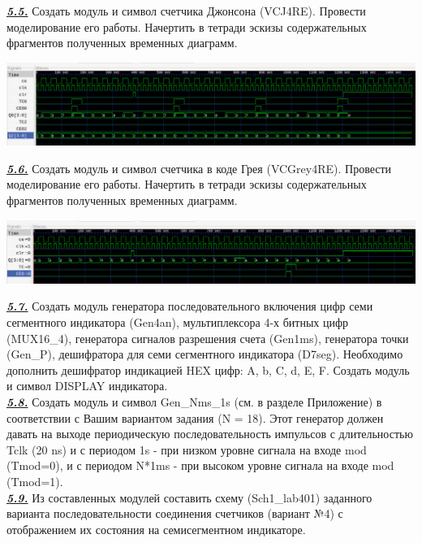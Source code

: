 \documentclass[a4paper]{article}
\begin{document}
\textbf{\textit{\underline{5.5.}}} Создать модуль и символ счетчика Джонсона (VCJ4RE). Провести моделирование его работы. Начертить в тетради эскизы содержательных фрагментов полученных временных диаграмм.
\begin{center}
	\includegraphics[scale=0.4]{../images/VCJ4RE.png}
\end{center}

\textbf{\textit{\underline{5.6.}}} Создать модуль и символ счетчика в коде Грея (VCGrey4RE). Провести моделирование его работы. Начертить в тетради эскизы содержательных фрагментов полученных временных диаграмм.
\begin{center}
	\includegraphics[scale=0.4]{../images/VCGrey4RE.png}
\end{center}

\textbf{\textit{\underline{5.7.}}} Создать модуль генератора последовательного включения цифр семи сегментного индикатора (Gen4an), мультиплексора 4-х битных цифр (MUX16\_4), генератора сигналов разрешения счета (Gen1ms), генератора точки (Gen\_P), дешифратора для семи сегментного индикатора (D7seg). Необходимо дополнить дешифратор индикацией HEX цифр: A, b, C, d, E, F. Создать модуль и символ DISPLAY индикатора.\\

\textbf{\textit{\underline{5.8.}}} Создать модуль и символ Gen\_Nms\_1s (см. в разделе Приложение) в соответствии с Вашим вариантом задания (N = 18). Этот генератор должен давать на выходе периодическую последовательность импульсов с длительностью Tclk (20 ns) и с периодом 1s - при низком уровне сигнала на входе mod (Tmod=0), и с периодом N*1ms - при высоком уровне сигнала на входе mod (Tmod=1).\\

\textbf{\textit{\underline{5.9.}}} Из составленных модулей составить схему (Sch1\_lab401) заданного варианта последовательности соединения счетчиков (вариант №4) с отображением их состояния на семисегментном индикаторе.\\
\end{document}
